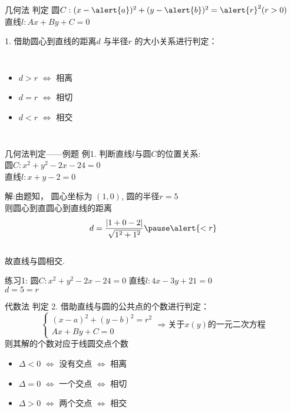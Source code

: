 \documentclass[12pt]{beamer}
\begin{document}
	\begin{frame}{几何法 判定}
		圆$ C: (x-\alert{a})^2+(y-\alert{b})^2=\alert{r}^2(r>0) $\\
		直线$ l: Ax+By+C=0 $ \vspace{20pt}

		1. 借助圆心到直线的\alert{距离$d$} 与\alert{半径$r$} 的大小关系进行判定：\vspace{22pt}

		\begin{columns}
			\begin{itemize}[<+- | alert@+>]
				\item $d>r$ $\Longleftrightarrow$ 相离
				\item $d=r$ $\Longleftrightarrow$ 相切
				\item $d<r$ $\Longleftrightarrow$ 相交
			\end{itemize}
		\end{columns}
	\end{frame}

	\begin{frame}{几何法判定——例题}
		\textcolor[rgb]{0.15,0.7,0.15}{例1.} 判断直线$l$与圆$C$的位置关系:\\
		圆$C: x^2+y^2-2x-24=0$\\
		直线$l: x+y-2=0$ \pause

		{\color{cyan} 解:由题知，
		圆心坐标为 $ (1,0) $, 圆的半径$r=5$\\ \pause
		则圆心到直圆心到直线的距离\[d=\frac{|1+0-2|}{\sqrt{1^2+1^2}} \pause \alert{< r} \]\\
		故直线与圆相交.
		}\pause

		\textcolor[rgb]{0.15,0.7,0.15}{练习1: }圆$C: x^2+y^2-2x-24=0$ \hspace{5pt}直线$l: 4x-3y+21=0$ \\\pause
		{\color{cyan} $d=5=r$ }
	\end{frame}

	\begin{frame}{代数法 判定}
		2. 借助直线与圆的公共点的个数进行判定：\vspace{22pt}
\begin{displaymath}
\left\{ \begin{array}{l}
(x-a)^2+(y-b)^2=r^2 \\
Ax+By+C=0
\end{array} \right.
\Longrightarrow
\textbf{关于$x(y)$的一元二次方程}
\end{displaymath}
则其\alert{解的个数}对应于\alert{线圆交点个数}
\begin{itemize}[<+- | alert@+>]
	\item $\Delta < 0$ $\Longleftrightarrow$ 没有交点 $\Longleftrightarrow$ 相离
	\item $\Delta = 0$ $\Longleftrightarrow$ 一个交点 $\Longleftrightarrow$ 相切
	\item $\Delta > 0$ $\Longleftrightarrow$ 两个交点 $\Longleftrightarrow$ 相交
\end{itemize}
	\end{frame}
\end{document}
